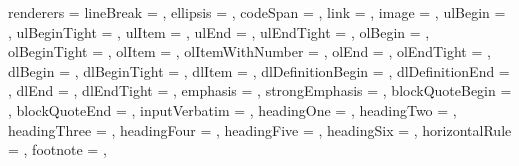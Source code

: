 renderers = {%
  lineBreak = {%
    },
  ellipsis = {%
    },
  codeSpan = {%
    },
  link = {%
    },
  image = {%
    },
  ulBegin = {%
    },
  ulBeginTight = {%
    },
  ulItem = {%
    },
  ulEnd = {%
    },
  ulEndTight = {%
    },
  olBegin = {%
    },
  olBeginTight = {%
    },
  olItem = {%
    },
  olItemWithNumber = {%
    },
  olEnd = {%
    },
  olEndTight = {%
    },
  dlBegin = {%
    },
  dlBeginTight = {%
    },
  dlItem = {%
    },
  dlDefinitionBegin = {%
    },
  dlDefinitionEnd = {%
    },
  dlEnd = {%
    },
  dlEndTight = {%
    },
  emphasis = {%
    },
  strongEmphasis = {%
    },
  blockQuoteBegin = {%
    },
  blockQuoteEnd = {%
    },
  inputVerbatim = {%
    },
  headingOne = {%
    },
  headingTwo = {%
    },
  headingThree = {%
    },
  headingFour = {%
    },
  headingFive = {%
    },
  headingSix = {%
    },
  horizontalRule = {%
    },
  footnote = {%
    },
}
